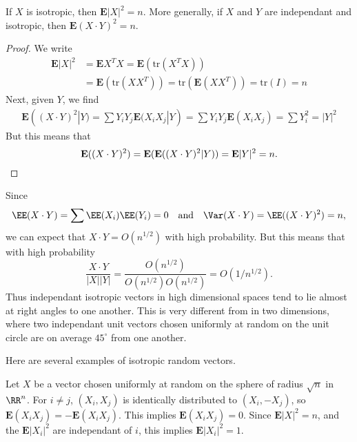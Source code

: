 \begin{lemma}
    If $X$ is isotropic, then $\mathbf{E} |X|^2 = n$. More generally, if $X$ and $Y$ are independant and isotropic, then $\mathbf{E}(X \cdot Y)^2 = n$.
\end{lemma}
\begin{proof}
    We write
    \begin{align*}
        \mathbf{E} |X|^2 &= \mathbf{E} X^T X = \mathbf{E} \left( \text{tr}(X^T X) \right)\\
        &= \mathbf{E} \left( \text{tr}(XX^T) \right) = \text{tr}(\mathbf{E}(XX^T)) = \text{tr}(I) = n
    \end{align*}
    Next, given $Y$, we find
    \begin{align*}
        \mathbf{E}((X \cdot Y)^2 | Y) = \sum Y_iY_j \mathbf{E}(X_iX_j|Y) = \sum Y_iY_j \mathbf{E}(X_iX_j) = \sum Y_i^2 = |Y|^2
    \end{align*}
    But this means that
    \[ \mathbf{E}((X \cdot Y)^2) = \mathbf{E}(\mathbf{E}((X \cdot Y)^2 | Y)) = \mathbf{E} |Y|^2 = n. \qedhere \]
\end{proof}

\begin{remark}
    Since
    \[ \EE(X \cdot Y) = \sum \EE(X_i) \EE(Y_i) = 0\quad\text{and}\quad \Var(X \cdot Y) = \EE((X \cdot Y)^2) = n, \]
    we can expect that $X \cdot Y = O(n^{1/2})$ with high probability. But this means that with high probability
    \[ \frac{X \cdot Y}{|X| |Y|} = \frac{O(n^{1/2})}{O(n^{1/2}) O(n^{1/2})} = O \left(1/n^{1/2} \right). \]
    Thus independant isotropic vectors in high dimensional spaces tend to lie almost at right angles to one another. This is very different from in two dimensions, where two independant unit vectors chosen uniformly at random on the unit circle are on average $45^\circ$ from one another.
\end{remark}

Here are several examples of isotropic random vectors.

\begin{example}
    Let $X$ be a vector chosen uniformly at random on the sphere of radius $\sqrt{n}$ in $\RR^n$. For $i \neq j$, $(X_i,X_j)$ is identically distributed to $(X_i,-X_j)$, so $\mathbf{E}(X_iX_j) = - \mathbf{E}(X_iX_j)$. This implies $\mathbf{E}(X_iX_j) = 0$. Since $\mathbf{E} |X|^2 = n$, and the $\mathbf{E} |X_i|^2$ are independant of $i$, this implies $\mathbf{E} |X_i|^2 = 1$.
\end{example}

